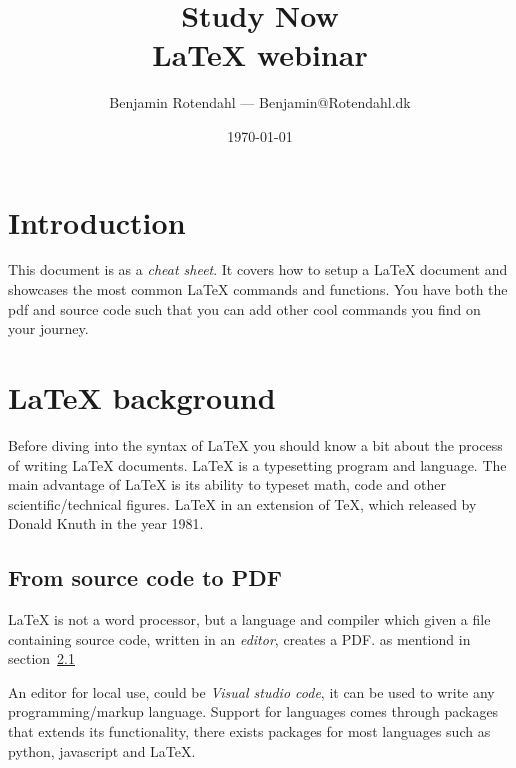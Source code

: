 \documentclass{article}
\title{
  \vspace{13em}
  \large{Study Now} \\
  \Large{\LaTeX{} webinar} \\
}
\author{
  Benjamin Rotendahl --- Benjamin@Rotendahl.dk
}
\date{
  \vspace{22em}
  \today
}
\begin{document}
\clearpage

\maketitle
\thispagestyle{empty}
\newpage

\thispagestyle{empty}\tableofcontents\newpage %

\setcounter{page}{1}

\section{Introduction}
 This document is as a \emph{cheat sheet}. It covers how to setup a \LaTeX{}
 document and showcases the most common \LaTeX{} commands and functions. You
 have both the pdf and source code such that you can add other cool commands
 you find on your journey.

\section{\LaTeX{} background}
 Before diving into the syntax of \LaTeX{} you should know a bit about the
 process of writing \LaTeX{} documents. \LaTeX{} is a typesetting program and
 language. The main advantage of \LaTeX{} is its ability to typeset math, code
 and other scientific/technical figures. \LaTeX{} in an extension of TeX, which
 released by Donald Knuth in the year 1981.

 \subsection{From source code to PDF}\label{sec:local}
   \LaTeX{} is not a word processor, but a language and compiler which given a
   file containing source code, written in an \emph{editor}, creates a PDF.
   as mentiond in section~\ref{sec:local}


   An editor for local use, could be \emph{Visual studio code}\cite{vscode}, it
   can be used to write any programming/markup language. Support for languages
   comes through packages that extends its functionality, there exists packages
   for most languages such as python, javascript and \LaTeX{}\cite{latexPackage}.
\end{document}

